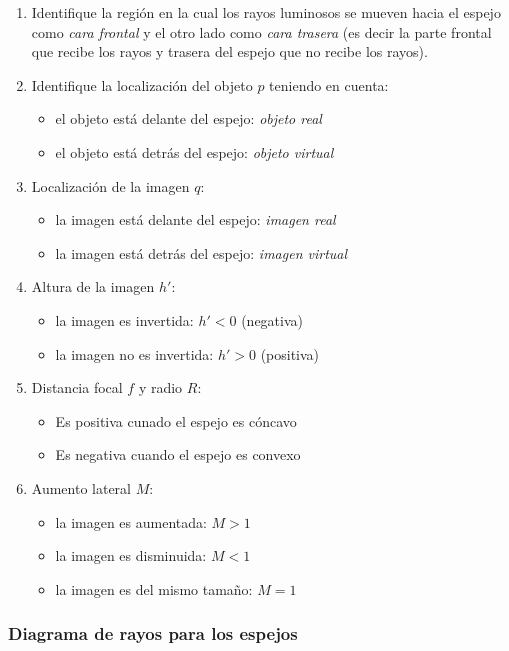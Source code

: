 \begin{enumerate}
  \item Identifique la región en la cual los rayos luminosos se mueven hacia el espejo como \textit{cara frontal} y el otro lado como \textit{cara trasera} (es decir la parte frontal que recibe los rayos y trasera del espejo que no recibe los rayos).
  \item Identifique la localización del objeto \(p\) teniendo en cuenta:
    \begin{itemize}
      \item el objeto está delante del espejo: \textit{objeto real}
      \item el objeto está detrás del espejo: \textit{objeto virtual}
    \end{itemize}
  \item  Localización de la imagen \(q\):
    \begin{itemize}
      \item la imagen está delante del espejo: \textit{imagen real}
      \item la imagen está detrás del espejo: \textit{imagen virtual}
    \end{itemize}
  \item Altura de la imagen \(h'\):
    \begin{itemize}
      \item la imagen es invertida: \(h' < 0\) (negativa)
      \item la imagen no es invertida: \(h' > 0\) (positiva)
    \end{itemize}
  \item Distancia focal \(f\) y radio \(R\):
    \begin{itemize}
      \item Es positiva cunado el espejo es cóncavo
      \item Es negativa cuando el espejo es convexo
    \end{itemize}
  \item Aumento lateral \(M\):
    \begin{itemize}
      \item la imagen es aumentada: \(M > 1\)
      \item la imagen es disminuida: \(M < 1\)
      \item la imagen es del mismo tamaño: \(M = 1\)
    \end{itemize}
\end{enumerate}

\subsubsection{Diagrama de rayos para los espejos}

